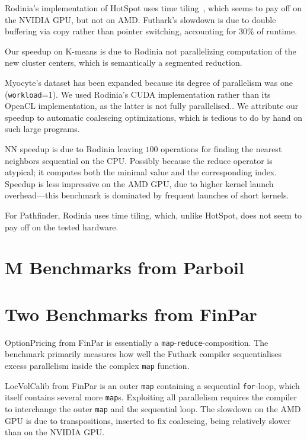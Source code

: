 Rodinia's implementation of HotSpot uses time
tiling~\cite{HexaTiling}, which seems to pay off on the NVIDIA GPU,
but not on AMD. Futhark's slowdown is due to double buffering via copy
rather than pointer switching, accounting for $30\%$ of runtime.

Our speedup on K-means is due to Rodinia not parallelizing computation
of the new cluster centers, which is semantically a segmented
reduction.

Myocyte's dataset has been expanded because its degree of parallelism
was one (\texttt{workload}=1).  We used Rodinia's CUDA implementation
rather than its OpenCL implementation, as the latter is not fully
parallelised..  We attribute our speedup to automatic coalescing
optimizations, which is tedious to do by hand on such large programs.

NN speedup is due to Rodinia leaving $100$  operations for
finding the nearest neighbors sequential on the CPU. Possibly because
the reduce operator is atypical; it computes both the minimal value
and the corresponding index.  Speedup is less impressive on the AMD
GPU, due to higher kernel launch overhead---this benchmark is
dominated by frequent launches of short kernels.

For Pathfinder, Rodinia uses time tiling, which, unlike HotSpot, does
not seem to pay off on the tested hardware.

\section{M Benchmarks from Parboil}

\section{Two Benchmarks from FinPar}
\label{sec:finpar}

OptionPricing from FinPar is essentially a
\lstinline{map}-\lstinline{reduce}-composition.  The benchmark primarily
measures how well the Futhark compiler sequentialises excess
parallelism inside the complex \lstinline{map} function.

LocVolCalib from FinPar is an outer \lstinline{map} containing a
sequential \lstinline{for}-loop, which itself contains several more
\lstinline{map}s.  Exploiting all parallelism requires the compiler to
interchange the outer \lstinline{map} and the sequential loop.  The
slowdown on the AMD GPU is due to transpositions, inserted to fix
coalescing, being relatively slower than on the NVIDIA GPU.


